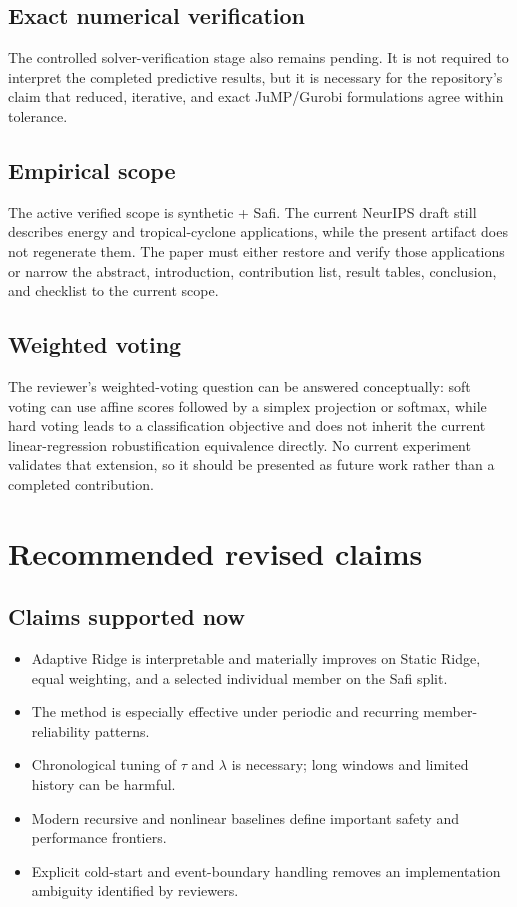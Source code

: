 \documentclass[10pt]{report}
\begin{document}
\section{Exact numerical verification}
The controlled solver-verification stage also remains pending. It is not required to interpret the completed predictive results, but it is necessary for the repository's claim that reduced, iterative, and exact JuMP/Gurobi formulations agree within tolerance.

\section{Empirical scope}
The active verified scope is synthetic + Safi. The current NeurIPS draft still describes energy and tropical-cyclone applications, while the present artifact does not regenerate them. The paper must either restore and verify those applications or narrow the abstract, introduction, contribution list, result tables, conclusion, and checklist to the current scope.

\section{Weighted voting}
The reviewer's weighted-voting question can be answered conceptually: soft voting can use affine scores followed by a simplex projection or softmax, while hard voting leads to a classification objective and does not inherit the current linear-regression robustification equivalence directly. No current experiment validates that extension, so it should be presented as future work rather than a completed contribution.

\chapter{Recommended revised claims}
\section{Claims supported now}
\begin{itemize}
\item Adaptive Ridge is interpretable and materially improves on Static Ridge, equal weighting, and a selected individual member on the Safi split.
\item The method is especially effective under periodic and recurring member-reliability patterns.
\item Chronological tuning of $\tau$ and $\lambda$ is necessary; long windows and limited history can be harmful.
\item Modern recursive and nonlinear baselines define important safety and performance frontiers.
\item Explicit cold-start and event-boundary handling removes an implementation ambiguity identified by reviewers.
\end{itemize}
\end{document}
